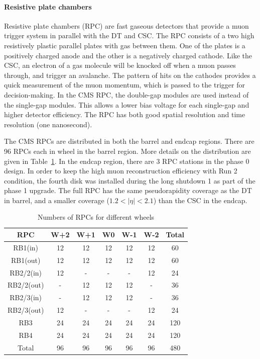 \paragraph{Resistive plate chambers}
Resistive plate chambers (RPC) are fast gaseous detectors that provide a muon trigger system in parallel with the DT and CSC. The RPC consists of a two high resistively plastic parallel plates with gas between them. One of the plates is a positively charged anode and the other is a negatively charged cathode. Like the CSC, an electron of a gas molecule will be knocked off when a muon passes through, and trigger an avalanche. The pattern of hits on the cathodes provides a quick measurement of the muon momentum, which is passed to the trigger for decision-making. In the CMS RPC, the double-gap modules are used instead of the single-gap modules. This allows a lower bias voltage for each single-gap and higher detector efficiency. The RPC has both good spatial resolution and time resolution (one nanosecond). 

The CMS RPCs are distributed in both the barrel and endcap regions. There are 96 RPCs each in wheel in the barrel region. More details on the distribution are given in Table~\ref{tab:c3cmsrpc}. In the endcap region, there are 3 RPC stations in the phase 0 design. In order to keep the high muon reconstruction efficiency with Run 2 condition, the fourth disk was installed during the long shutdown 1 as part of the phase 1 upgrade. The full RPC has the same pseudorapidity coverage as the DT in barrel, and a smaller coverage ($1.2<|\eta|<2.1$) than the CSC in the endcap.

\begin{table}[htbp]
\fontsize{10 pt}{1.2 em}
\selectfont
\begin{centering}
\caption{\label{tab:c3cmsrpc} Numbers of RPCs for different wheels}
\hspace*{-4ex}
\begin{tabular}{|c|c|c|c|c|c|c|}
\hline
 RPC &  W+2 & W+1 & W0 & W-1 & W-2 & Total \\
\hline
 RB1(in) & 12 & 12 & 12 & 12 & 12 & 60 \\
\hline
 RB1(out) & 12 & 12 & 12 & 12 & 12 & 60 \\
\hline
 RB2/2(in) & 12 & - & - & - & 12 & 24 \\
\hline
 RB2/2(out) & - & 12 & 12 & 12 & - & 36 \\
\hline
 RB2/3(in) & - & 12 & 12 & 12 & - & 36 \\
\hline
 RB2/3(out) & 12 & - & - & - & 12 & 24 \\
\hline
 RB3 & 24 & 24 & 24 & 24 & 24 & 120 \\
\hline
 RB4 & 24 & 24 & 24 & 24 & 24 & 120 \\
\hline
 Total & 96 & 96 & 96 & 96 & 96 & 480 \\
\hline
\end{tabular}
\par\end{centering}
\end{table}

